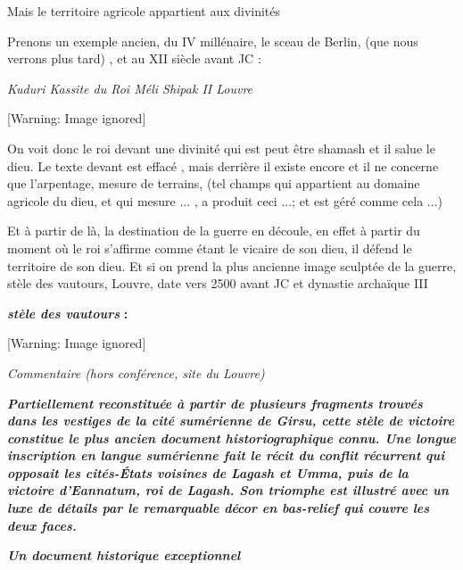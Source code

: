 \documentclass[a4paper,10pt]{article}
\begin{document}
Mais le territoire agricole appartient aux divinités

Prenons un exemple ancien, du IV millénaire, le sceau de Berlin, (que
nous verrons plus tard) , et au XII siècle avant JC :

\textit{Kuduri Kassite du Roi Méli Shipak II  Louvre}

  [Warning: Image ignored] %
 

On voit donc le roi devant une divinité qui est peut être shamash et il
salue le dieu. Le texte devant est effacé , mais derrière il existe
encore et il ne concerne que l'arpentage, mesure de
terrains, (tel champs qui appartient au domaine agricole du dieu, et
qui mesure ... , a produit ceci ...; et est géré comme cela ...)

Et à partir de là, la destination de la guerre en découle,  en effet à
partir du moment où le roi s'affirme comme étant le
vicaire de son dieu, il défend le territoire de son dieu. Et si on
prend la plus ancienne image sculptée de la guerre, stèle des vautours,
Louvre, date vers 2500 avant JC et dynastie archaïque III

\textbf{\textit{stèle des vautours}}\textbf{ : }

  [Warning: Image ignored] %
 

\textit{Commentaire  (hors conférence, site du Louvre)}

\textbf{\textit{\textcolor[rgb]{0.101960786,0.101960786,0.101960786}{Partiellement
reconstituée à partir de plusieurs fragments trouvés dans les vestiges
de la cité sumérienne de Girsu, cette stèle de victoire constitue le
plus ancien document historiographique connu. Une longue inscription en
langue sumérienne fait le récit du conflit récurrent qui opposait les
cités-États voisines de Lagash et Umma, puis de la victoire
d'Eannatum, roi de Lagash. Son triomphe est illustré
avec un luxe de détails par le remarquable décor en bas-relief qui
couvre les deux faces.}}}

\textbf{\textit{Un document historique exceptionnel}}
\end{document}
